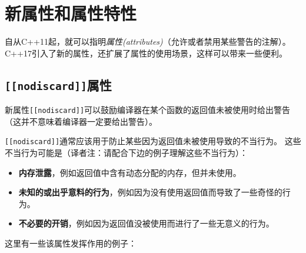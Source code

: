 \chapter{新属性和属性特性}\label{ch7}
自从C++11起，就可以指明\emph{属性(attributes)}（允许或者禁用某些警告的注解）。
C++17引入了新的属性，还扩展了属性的使用场景，这样可以带来一些便利。


\section{\texttt{[[nodiscard]]}属性}\label{ch7.1}
新属性\texttt{[[nodiscard]]}可以鼓励编译器在某个函数的返回值未被使用时给出警告
（这并不意味着编译器一定要给出警告）。

\texttt{[[nodiscard]]}通常应该用于防止某些因为返回值未被使用导致的不当行为。
这些不当行为可能是（译者注：请配合下边的例子理解这些不当行为）：
\begin{itemize}
    \item \textbf{内存泄露}，例如返回值中含有动态分配的内存，但并未使用。
    \item \textbf{未知的或出乎意料的行为}，例如因为没有使用返回值而导致了一些奇怪的行为。
    \item \textbf{不必要的开销}，例如因为返回值没被使用而进行了一些无意义的行为。
\end{itemize}
这里有一些该属性发挥作用的例子：
